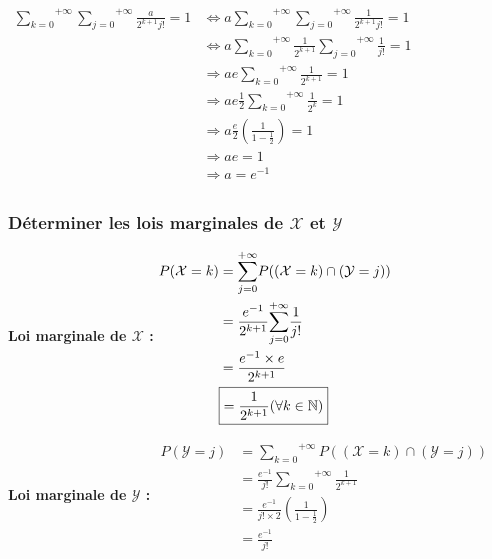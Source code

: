 \documentclass[a4paper, 12pt]{article}
\begin{document}
$
\begin{aligned}
\overset{+\infty}{\underset{k = 0}{\sum}} \overset{+\infty}{\underset{j = 0}{\sum}} \frac{a}{2^{k+1} j!} = 1 &\Leftrightarrow a \overset{+\infty}{\underset{k = 0}{\sum}} \overset{+\infty}{\underset{j = 0}{\sum}} \frac{1}{2^{k+1} j!} = 1 \\
&\Leftrightarrow a \overset{+\infty}{\underset{k = 0}{\sum}} \frac{1}{2^{k+1}} \overset{+\infty}{\underset{j = 0}{\sum}} \frac{1}{j!} = 1 \\
&\Rightarrow ae \overset{+\infty}{\underset{k = 0}{\sum}} \frac{1}{2^{k+1}} = 1 \\
&\Rightarrow ae \frac{1}{2} \overset{+\infty}{\underset{k = 0}{\sum}} \frac{1}{2^k} = 1 \\
&\Rightarrow a \frac{e}{2} (\frac{1}{1 - \frac{1}{2}}) = 1 \\
&\Rightarrow ae = 1 \\
&\boxed{\Rightarrow a = e^{-1}} \\
\end{aligned}
$


\subsubsection{Déterminer les lois marginales de $\mathcal{X}$ et $\mathcal{Y}$}
\textbf{Loi marginale de $\mathcal{X}$ :}
$
\begin{aligned}
P (\mathcal{X} = k) &= \overset{+\infty}{\underset{j = 0}{\sum}} P ((\mathcal{X} = k) \cap (\mathcal{Y} = j)) \\
&= \frac{e^{-1}}{2^{k+1}} \overset{+\infty}{\underset{j = 0}{\sum}} \frac{1}{j!} \\
&= \frac{e^{-1} \times e}{2^{k+1}} \\
&\boxed{= \frac{1}{2^{k+1}} (\forall k \in \mathbb{N})} \\
\end{aligned}\\
$

\bigskip

\textbf{Loi marginale de $\mathcal{Y}$ :}
$
\begin{aligned}
P (\mathcal{Y} = j) &= \overset{+\infty}{\underset{k = 0}{\sum}} P ((\mathcal{X} = k) \cap (\mathcal{Y} = j)) \\
&= \frac{e^{-1}}{j!} \overset{+\infty}{\underset{k = 0}{\sum}} \frac{1}{2^{k+1}} \\
&= \frac{e^{-1}}{j! \times 2} (\frac{1}{1 - \frac{1}{2}}) \\
&\boxed{= \frac{e^{-1}}{j!}}
\end{aligned}
$
\end{document}
